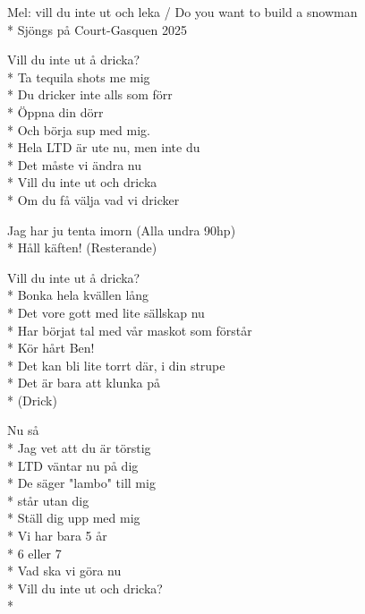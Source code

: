 \begin{SongText}
    \begin{SongInfo}
        Mel: vill du inte ut och leka / Do you want to build a snowman\\*%
        Sjöngs på Court-Gasquen 2025
    \end{SongInfo}
    \begin{SongVerse}
        Vill du inte ut å dricka?\\*%
        Ta tequila shots me mig\\*%
        Du dricker inte alls som förr\\*%
        Öppna din dörr\\*%
        Och börja sup med mig.\\*%
        Hela LTD är ute nu, men inte du\\*%
        Det måste vi ändra nu\\*%
        Vill du inte ut och dricka\\*%
        Om du få välja vad vi dricker
    \end{SongVerse}
    \begin{SongVerse}
        Jag har ju tenta imorn (Alla undra 90hp)\\*%
        Håll käften! (Resterande)
    \end{SongVerse}
    \begin{SongVerse}
        Vill du inte ut å dricka?\\*%
        Bonka hela kvällen lång\\*%
        Det vore gott med lite sällskap nu\\*%
        Har börjat tal med vår maskot som förstår\\*%
        Kör hårt Ben!\\*%
        Det kan bli lite torrt där, i din strupe\\*%
        Det är bara att klunka på\\*%
        (Drick) 
    \end{SongVerse}
    \begin{SongVerse}
        Nu så\\*%
        Jag vet att du är törstig\\*%
        LTD väntar nu på dig\\*%
        De säger "lambo" till mig\\*%
        står utan dig\\*%
        Ställ dig upp med mig\\*%
        Vi har bara 5 år\\*%
        6 eller 7\\*%
        Vad ska vi göra nu\\*%
        Vill du inte ut och dricka?\\*%
    \end{SongVerse}
\end{SongText}
